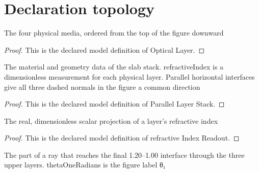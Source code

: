 \section{Declaration topology}
\begin{definition}
  \label{def:physics:phyx-mini-0021:phyxminiproblems-problemphyxmini0021-opticallayer}
  The four physical media, ordered from the top of the figure downward
\end{definition}
\begin{proof}
  This is the declared model definition of Optical Layer.
\end{proof}
\begin{definition}
  \label{def:physics:phyx-mini-0021:phyxminiproblems-problemphyxmini0021-parallellayerstack}
  The material and geometry data of the slab stack. refractiveIndex is a dimensionless measurement for each physical layer. Parallel horizontal interfaces give all three dashed normals in the figure a common direction
\end{definition}
\begin{proof}
  This is the declared model definition of Parallel Layer Stack.
\end{proof}
\begin{definition}
  \label{def:physics:phyx-mini-0021:phyxminiproblems-problemphyxmini0021-refractiveindexreadout}
  The real, dimensionless scalar projection of a layer's refractive index
\end{definition}
\begin{proof}
  This is the declared model definition of refractive Index Readout.
\end{proof}
\begin{definition}
  \label{def:physics:phyx-mini-0021:phyxminiproblems-problemphyxmini0021-upperstackray}
  The part of a ray that reaches the final 1.20--1.00 interface through the three upper layers. thetaOneRadians is the figure label θ₁
\end{definition}
